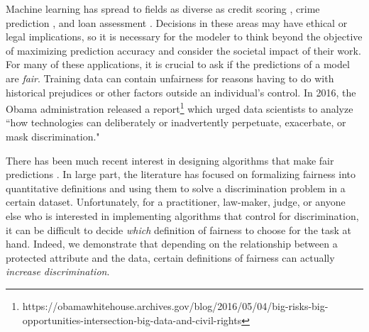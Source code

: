 Machine learning has spread to fields as diverse as credit scoring
\cite{khandani2010consumer}, crime prediction
\cite{brennan2009evaluating}, and loan assessment
\cite{mahoney2007method}. Decisions in these areas may have ethical
or legal implications, so it is necessary for the modeler to think
beyond the objective of maximizing prediction accuracy
and consider the societal impact of their work. 
For many of these applications, it is crucial to ask if the
predictions of a model are \emph{fair}.
Training data can contain unfairness for reasons having to do
with historical prejudices or other factors outside an individual's
control.
In 2016, the Obama
administration released a report\footnote{https://obamawhitehouse.archives.gov/blog/2016/05/04/big-risks-big-opportunities-intersection-big-data-and-civil-rights}
which urged data
scientists to analyze ``how technologies can deliberately or
inadvertently perpetuate, exacerbate, or mask
discrimination."

There has been much recent interest in designing
algorithms that make fair predictions
\cite{hardt2016equality,dwork2012fairness,joseph2016rawlsian,kamishima2011fairness,zliobaite2015survey,zafar2016fairness,zafar2015learning,grgiccase,kleinberg2016inherent,calders2010three,kamiran2012data,bolukbasi2016man,kamiran2009classifying,zemel2013learning,louizos2015variational}. 
In large part, the literature has
focused on formalizing fairness into quantitative definitions and using them to solve a
discrimination problem in a certain dataset. Unfortunately, for a
practitioner, law-maker, judge, or anyone else who is interested in
implementing algorithms that control for discrimination, it can be
difficult to decide {\em which} definition of fairness to choose for the
task at hand. Indeed, we demonstrate that depending on the
relationship between a protected attribute and the data, certain
definitions of fairness can actually \emph{increase discrimination}.


